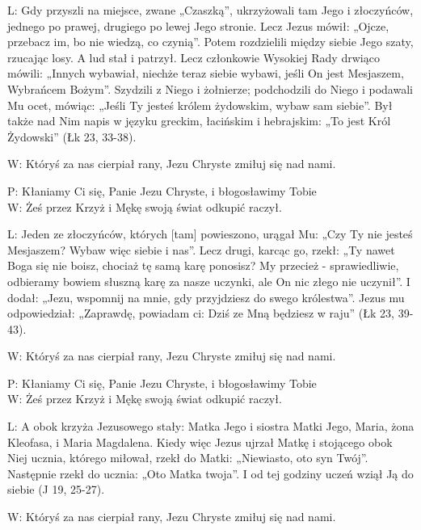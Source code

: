 ﻿\documentclass[9pt,twoside]{extarticle}
\begin{document}
{\hnr L:} Gdy przyszli na miejsce, zwane „Czaszką”, ukrzyżowali tam Jego i złoczyńców, jednego po prawej, drugiego po lewej Jego stronie. Lecz Jezus mówił: „Ojcze, przebacz im, bo nie wiedzą, co czynią”. Potem rozdzielili między siebie Jego szaty, rzucając losy. A lud stał i patrzył. Lecz członkowie Wysokiej Rady drwiąco mówili: „Innych wybawiał, niechże teraz siebie wybawi, jeśli On jest Mesjaszem, Wybrańcem Bożym”. Szydzili z Niego i żołnierze; podchodzili do Niego i podawali Mu ocet, mówiąc: „Jeśli Ty jesteś królem żydowskim, wybaw sam siebie”. Był także nad Nim napis w języku greckim, łacińskim i hebrajskim: „To jest Król Żydowski” (Łk 23, 33-38).


{\hnr W:} Któryś za nas cierpiał rany, Jezu Chryste zmiłuj się nad nami.


{\hnr{}}


{\hnr P:} Kłaniamy Ci się, Panie Jezu Chryste, i błogosławimy Tobie\\
{\hnr W:} Żeś przez Krzyż i Mękę swoją świat odkupić raczył.


{\hnr L:} Jeden ze złoczyńców, których [tam] powieszono, urągał Mu: „Czy Ty nie jesteś Mesjaszem? Wybaw więc siebie i nas”. Lecz drugi, karcąc go, rzekł: „Ty nawet Boga się nie boisz, chociaż tę samą karę ponosisz? My przecież - sprawiedliwie, odbieramy bowiem słuszną karę za nasze uczynki, ale On nic złego nie uczynił”. I dodał: „Jezu, wspomnij na mnie, gdy przyjdziesz do swego królestwa”. Jezus mu odpowiedział: „Zaprawdę, powiadam ci: Dziś ze Mną będziesz w raju” (Łk 23, 39-43).


{\hnr W:} Któryś za nas cierpiał rany, Jezu Chryste zmiłuj się nad nami.


{\hnr{}}


{\hnr P:} Kłaniamy Ci się, Panie Jezu Chryste, i błogosławimy Tobie\\
{\hnr W:} Żeś przez Krzyż i Mękę swoją świat odkupić raczył.


{\hnr L:} A obok krzyża Jezusowego stały: Matka Jego i siostra Matki Jego, Maria, żona Kleofasa, i Maria Magdalena. Kiedy więc Jezus ujrzał Matkę i stojącego obok Niej ucznia, którego miłował, rzekł do Matki: „Niewiasto, oto syn Twój”. Następnie rzekł do ucznia: „Oto Matka twoja”. I od tej godziny uczeń wziął Ją do siebie (J 19, 25-27).


{\hnr W:} Któryś za nas cierpiał rany, Jezu Chryste zmiłuj się nad nami.
\end{document}
